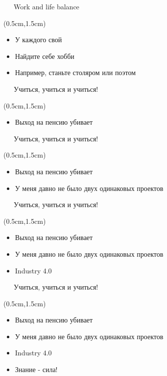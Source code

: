 \documentclass[xetex,18pt,aspectratio=43]{beamer}
\begin{document}
\begin{Large}
\begin{frame}{\ \ \ Work and life balance}
\begin{textblock*}{\framewidth-0.8cm}(0.5cm,1.5cm)
\begin{itemize}
  \item У каждого свой
  \item Найдите себе хобби
  \item Например, станьте столяром или поэтом
\end{itemize}
\end{textblock*}
\end{frame}

\begin{frame}{\ \ \ Учиться, учиться и учиться!}
\begin{textblock*}{\framewidth-0.8cm}(0.5cm,1.5cm)
\begin{itemize}
  \item Выход на пенсию убивает
\end{itemize}
\end{textblock*}
\end{frame}

\begin{frame}{\ \ \ Учиться, учиться и учиться!}
\begin{textblock*}{\framewidth-0.8cm}(0.5cm,1.5cm)
\begin{itemize}
  \item Выход на пенсию убивает
  \item У меня давно не было двух одинаковых проектов
\end{itemize}
\end{textblock*}
\end{frame}

\begin{frame}{\ \ \ Учиться, учиться и учиться!}
\begin{textblock*}{\framewidth-0.8cm}(0.5cm,1.5cm)
\begin{itemize}
  \item Выход на пенсию убивает
  \item У меня давно не было двух одинаковых проектов
  \item Industry 4.0
\end{itemize}
\end{textblock*}
\end{frame}

\begin{frame}{\ \ \ Учиться, учиться и учиться!}
\begin{textblock*}{\framewidth-0.8cm}(0.5cm,1.5cm)
\begin{itemize}
  \item Выход на пенсию убивает
  \item У меня давно не было двух одинаковых проектов
  \item Industry 4.0
  \item Знание - сила!
\end{itemize}
\end{textblock*}
\end{frame}


\end{Large}
\end{document}
